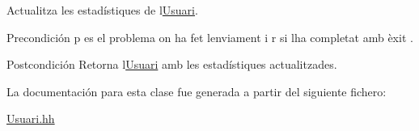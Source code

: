 Actualitza les estadístiques de l\textquotesingle{}\mbox{\hyperlink{class_usuari}{Usuari}}. 

\begin{DoxyPrecond}{Precondición}
p es el problema on ha fet l\textquotesingle{}enviament i r si l\textquotesingle{}ha completat amb èxit . 
\end{DoxyPrecond}
\begin{DoxyPostcond}{Postcondición}
Retorna l\textquotesingle{}\mbox{\hyperlink{class_usuari}{Usuari}} amb les estadístiques actualitzades. 
\end{DoxyPostcond}


La documentación para esta clase fue generada a partir del siguiente fichero\+:\begin{DoxyCompactItemize}
\item 
\mbox{\hyperlink{_usuari_8hh}{Usuari.\+hh}}\end{DoxyCompactItemize}
